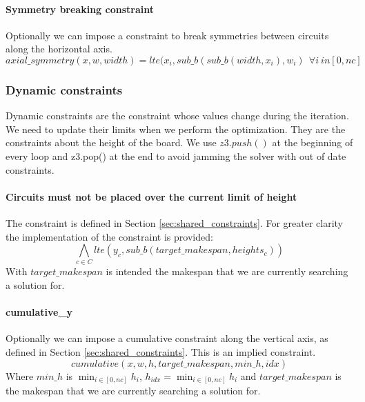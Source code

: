     \paragraph*{Symmetry breaking constraint}
      Optionally we can impose a constraint to break symmetries between circuits along
      the horizontal axis.
      \begin{equation*}
        axial\_symmetry(x, w, width) = lte(x_i, sub\_b(sub\_b(width, x_i), w_i) \ \ \forall i \ in [0, nc]
      \end{equation*}

  \subsubsection{Dynamic constraints}  \label{subsec:SAT_dynamic_cons}
    Dynamic constraints are the constraint whose values change during the iteration. We
    need to update their limits when we perform the optimization. They are the constraints 
    about the height of the board. We use \(z3.push()\) at the beginning of every loop and z3.pop()
    at the end to avoid jamming the solver with out of date constraints.\\

    \paragraph*{Circuits must not be placed over the current limit of height}
    The constraint is defined in Section \ref{sec:shared_constraints}. 
    For greater clarity the implementation of the constraint is provided:
      \begin{equation*}
          \bigwedge_{c \in C} lte(y_c, sub\_b(target\_makespan, heights_c))
      \end{equation*}
      With \(target\_makespan\) is intended the makespan that we are currently searching a solution for.

    \paragraph*{cumulative\_y}
    Optionally we can impose a cumulative constraint along the vertical axis, 
    as defined in Section \ref{sec:shared_constraints}.
    This is an implied constraint.
      \[cumulative(x, w, h, target\_makespan, min\_h, idx) \]
    Where \(min\_h\) is \(\min_{i \in [0,nc]} h_i\), \( h_{idx} = \min_{i \in [0,nc]} h_i\) and 
    \(target\_makespan\) is the makespan that we are currently searching a solution for.

